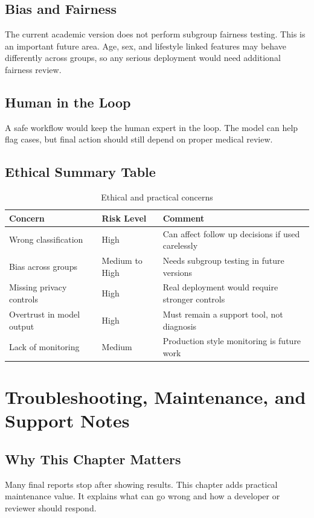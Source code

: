 \documentclass[12pt,a4paper,openany]{report}
\begin{document}
    \section{Bias and Fairness}
    The current academic version does not perform subgroup fairness testing. This is an important future area. Age, sex, and lifestyle linked features may behave differently across groups, so any serious deployment would need additional fairness review.

    \section{Human in the Loop}
    A safe workflow would keep the human expert in the loop. The model can help flag cases, but final action should still depend on proper medical review.

    \section{Ethical Summary Table}
    \begin{table}[H]
    \centering
    \caption{Ethical and practical concerns}
    \begin{tabularx}{\textwidth}{>{\raggedright\arraybackslash}p{4.0cm} >{\raggedright\arraybackslash}p{2.4cm} X}
    \toprule
    \textbf{Concern} & \textbf{Risk Level} & \textbf{Comment} \\
    \midrule
    Wrong classification & High & Can affect follow up decisions if used carelessly \\
    Bias across groups & Medium to High & Needs subgroup testing in future versions \\
    Missing privacy controls & High & Real deployment would require stronger controls \\
    Overtrust in model output & High & Must remain a support tool, not diagnosis \\
    Lack of monitoring & Medium & Production style monitoring is future work \\
    \bottomrule
    \end{tabularx}
    \end{table}

    \chapter{Troubleshooting, Maintenance, and Support Notes}
    \section{Why This Chapter Matters}
    Many final reports stop after showing results. This chapter adds practical maintenance value. It explains what can go wrong and how a developer or reviewer should respond.
\end{document}
